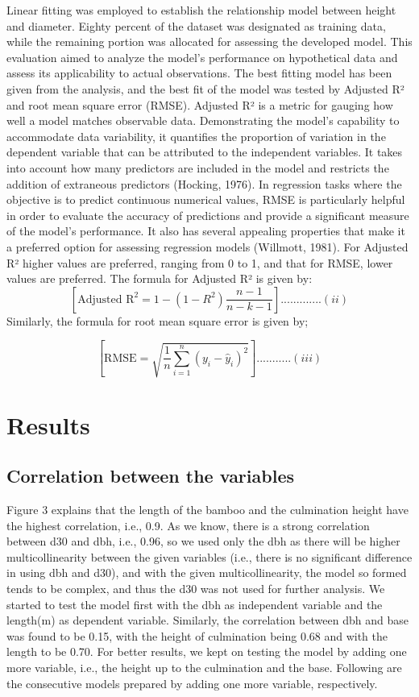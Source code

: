 \documentclass[preprint, 3p,
authoryear]{elsarticle} %
\begin{document}
Linear fitting was employed to establish the relationship model between
height and diameter. Eighty percent of the dataset was designated as
training data, while the remaining portion was allocated for assessing
the developed model. This evaluation aimed to analyze the model's
performance on hypothetical data and assess its applicability to actual
observations. The best fitting model has been given from the analysis,
and the best fit of the model was tested by Adjusted R² and root mean
square error (RMSE). Adjusted R² is a metric for gauging how well a
model matches observable data. Demonstrating the model's capability to
accommodate data variability, it quantifies the proportion of variation
in the dependent variable that can be attributed to the independent
variables. It takes into account how many predictors are included in the
model and restricts the addition of extraneous predictors (Hocking,
1976). In regression tasks where the objective is to predict continuous
numerical values, RMSE is particularly helpful in order to evaluate the
accuracy of predictions and provide a significant measure of the model's
performance. It also has several appealing properties that make it a
preferred option for assessing regression models (Willmott, 1981). For
Adjusted R² higher values are preferred, ranging from 0 to 1, and that
for RMSE, lower values are preferred. The formula for Adjusted R² is
given by:
\[[\text{Adjusted R}^2 = 1 - \left(1 - R^2\right) \frac{n - 1}{n - k - 1}].............(ii)\]
Similarly, the formula for root mean square error is given by;

\[[ \text{RMSE} = \sqrt{\frac{1}{n}\sum_{i=1}^{n}(y_i - \hat{y}_i)^2} ]...........(iii)\]

\hypertarget{results}{%
\section{Results}\label{results}}

\hypertarget{correlation-between-the-variables}{%
\subsection{Correlation between the
variables}\label{correlation-between-the-variables}}

Figure 3 explains that the length of the bamboo and the culmination
height have the highest correlation, i.e., 0.9. As we know, there is a
strong correlation between d30 and dbh, i.e., 0.96, so we used only the
dbh as there will be higher multicollinearity between the given
variables (i.e., there is no significant difference in using dbh and
d30), and with the given multicollinearity, the model so formed tends to
be complex, and thus the d30 was not used for further analysis. We
started to test the model first with the dbh as independent variable and
the length(m) as dependent variable. Similarly, the correlation between
dbh and base was found to be 0.15, with the height of culmination being
0.68 and with the length to be 0.70. For better results, we kept on
testing the model by adding one more variable, i.e., the height up to
the culmination and the base. Following are the consecutive models
prepared by adding one more variable, respectively.
\end{document}
